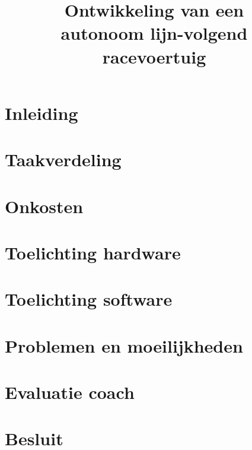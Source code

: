 \documentclass[11pt,a4paper]{report}
\title{Ontwikkeling van een\\autonoom lijn-volgend\\racevoertuig}
\subtitle{}
\begin{document}
\preface
\tableofcontents

\chapter{Inleiding}\label{sec:inleiding}

\chapter{Taakverdeling}\label{sec:taakverdeling}

\chapter{Onkosten}\label{sec:onkosten}

\chapter{Toelichting hardware}\label{sec:toelichting-hardware}

\chapter{Toelichting software}\label{sec:toelichting-software}

\chapter{Problemen en moeilijkheden}\label{sec:problemen-en-moeilijkheden}

\chapter{Evaluatie coach}\label{sec:evaluatie-coach}

\chapter{Besluit}\label{sec:besluit}



\end{document}
